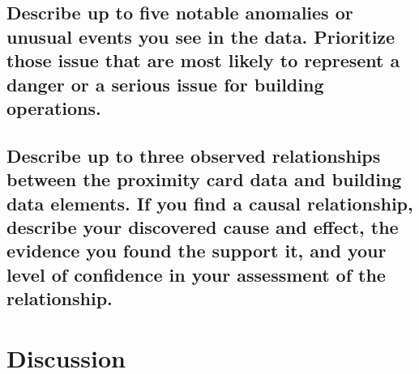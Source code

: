 \documentclass[aps, 10pt, a4paper]{article}
\begin{document}
        \subsection[Question 3]{Describe up to five notable anomalies or unusual events you see in the data. Prioritize those issue that are most likely to represent a danger or a serious issue for building operations.}
        
        \subsection[Question 4]{Describe up to three observed relationships between the proximity card data and building data elements. If you find a causal relationship, describe your discovered cause and effect, the evidence you found the support it, and your level of confidence in your assessment of the relationship.}
    
    \section{Discussion}
    
    
    
\end{document}
